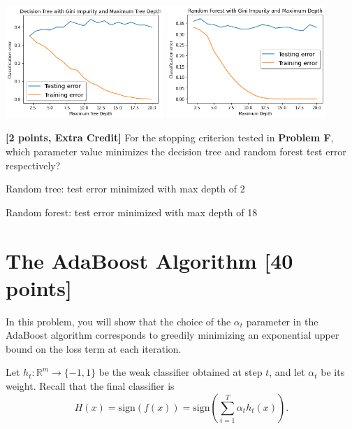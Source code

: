 \begin{solution}
   
    \includegraphics[width=0.45\textwidth]{images/2f_tree.png}
    \includegraphics[width=0.45\textwidth]{images/2f_forest.png}
\end{solution}

\problem\textbf{[2 points, Extra Credit] }For the stopping criterion tested in \textbf{Problem F}, which parameter value minimizes the decision tree and random forest test error respectively? 

\begin{solution}

    Random tree: test error minimized with max depth of 2

    Random forest: test error minimized with max depth of 18
\end{solution}



\newpage
\section{The AdaBoost Algorithm [40 points]}

In this problem, you will show that the choice of the $\alpha_t$ parameter in
the AdaBoost algorithm corresponds to greedily minimizing an exponential upper
bound on the loss term at each iteration.

\problem[3]
Let $h_t: \mathbb{R}^m \rightarrow \{-1,1\}$ be the weak classifier obtained at step $t$, and let $\alpha_t$ be
its weight. Recall that the final classifier is $$H(x) = \text{sign}(f(x)) = \text{sign} \left(\sum\limits_{i=1}^T \alpha_{t}h_t(x) \right).$$

